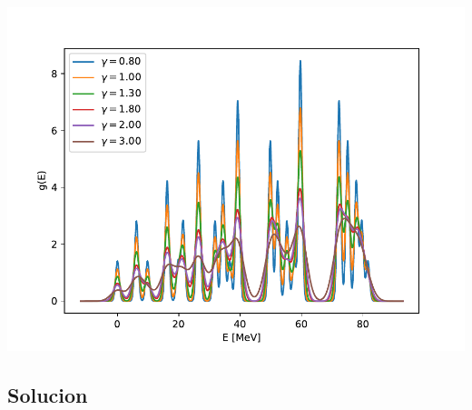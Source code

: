 \begin{texercise}
\begin{center}
        \includegraphics[width=0.6\linewidth]{Cuerpo/Boletin_01/ge.pdf}
    \end{center}
\end{texercise}


\tcbstoprecording


\subsection{Solucion}
\tcbinputrecords